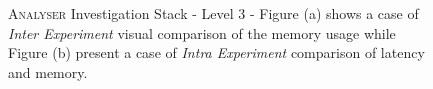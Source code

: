 \begin{figure}[tbh]
  \centering
\caption[\textsc{Analyser} Investigation Stack - Level 3 - Visual Comparison Examples]{\textsc{Analyser} Investigation Stack - Level 3 - Figure (a) shows a case of \textit{Inter Experiment} visual comparison of the memory usage while Figure (b) present a case of \textit{Intra Experiment} comparison of latency and memory.}
  \label{fig:visual-comp}
\end{figure}